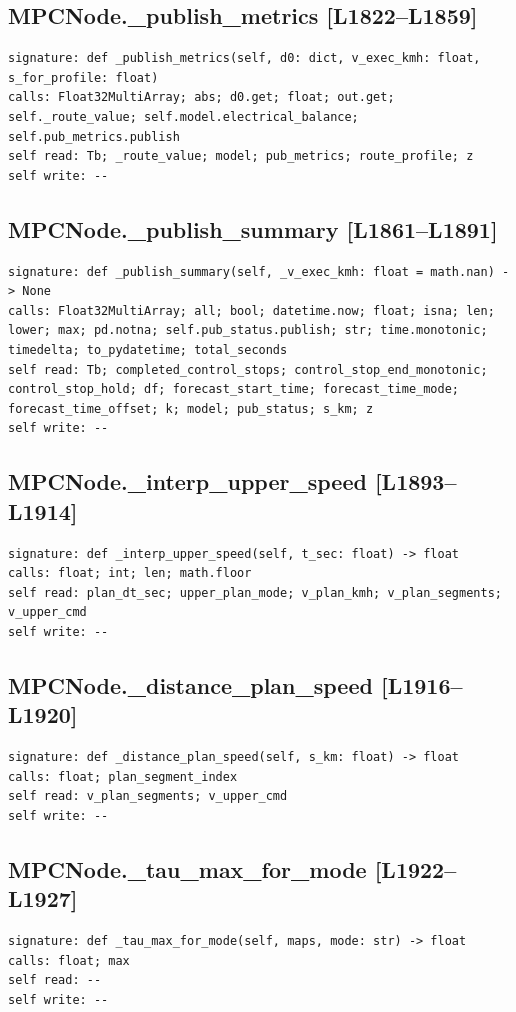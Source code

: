 \documentclass[a4paper,10pt,oneside]{book}
\begin{document}
\subsection*{MPCNode.\_publish\_metrics [L1822--L1859]}
\begin{lstlisting}[numbers=none]
signature: def _publish_metrics(self, d0: dict, v_exec_kmh: float, s_for_profile: float)
calls: Float32MultiArray; abs; d0.get; float; out.get; self._route_value; self.model.electrical_balance; self.pub_metrics.publish
self read: Tb; _route_value; model; pub_metrics; route_profile; z
self write: --
\end{lstlisting}
\subsection*{MPCNode.\_publish\_summary [L1861--L1891]}
\begin{lstlisting}[numbers=none]
signature: def _publish_summary(self, _v_exec_kmh: float = math.nan) -> None
calls: Float32MultiArray; all; bool; datetime.now; float; isna; len; lower; max; pd.notna; self.pub_status.publish; str; time.monotonic; timedelta; to_pydatetime; total_seconds
self read: Tb; completed_control_stops; control_stop_end_monotonic; control_stop_hold; df; forecast_start_time; forecast_time_mode; forecast_time_offset; k; model; pub_status; s_km; z
self write: --
\end{lstlisting}
\subsection*{MPCNode.\_interp\_upper\_speed [L1893--L1914]}
\begin{lstlisting}[numbers=none]
signature: def _interp_upper_speed(self, t_sec: float) -> float
calls: float; int; len; math.floor
self read: plan_dt_sec; upper_plan_mode; v_plan_kmh; v_plan_segments; v_upper_cmd
self write: --
\end{lstlisting}
\subsection*{MPCNode.\_distance\_plan\_speed [L1916--L1920]}
\begin{lstlisting}[numbers=none]
signature: def _distance_plan_speed(self, s_km: float) -> float
calls: float; plan_segment_index
self read: v_plan_segments; v_upper_cmd
self write: --
\end{lstlisting}
\subsection*{MPCNode.\_tau\_max\_for\_mode [L1922--L1927]}
\begin{lstlisting}[numbers=none]
signature: def _tau_max_for_mode(self, maps, mode: str) -> float
calls: float; max
self read: --
self write: --
\end{lstlisting}
\end{document}
